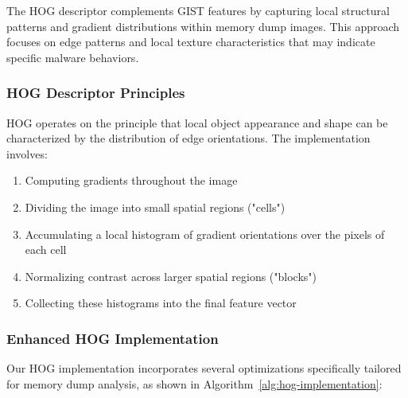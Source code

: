The HOG descriptor complements GIST features by capturing local structural patterns and gradient distributions within memory dump images. This approach focuses on edge patterns and local texture characteristics that may indicate specific malware behaviors.

\subsubsection{HOG Descriptor Principles}

HOG operates on the principle that local object appearance and shape can be characterized by the distribution of edge orientations. The implementation involves:

\begin{enumerate}
    \item Computing gradients throughout the image
    \item Dividing the image into small spatial regions ("cells")
    \item Accumulating a local histogram of gradient orientations over the pixels of each cell
    \item Normalizing contrast across larger spatial regions ("blocks")
    \item Collecting these histograms into the final feature vector
\end{enumerate}

\subsubsection{Enhanced HOG Implementation}

Our HOG implementation incorporates several optimizations specifically tailored for memory dump analysis, as shown in Algorithm~\ref{alg:hog-implementation}:

